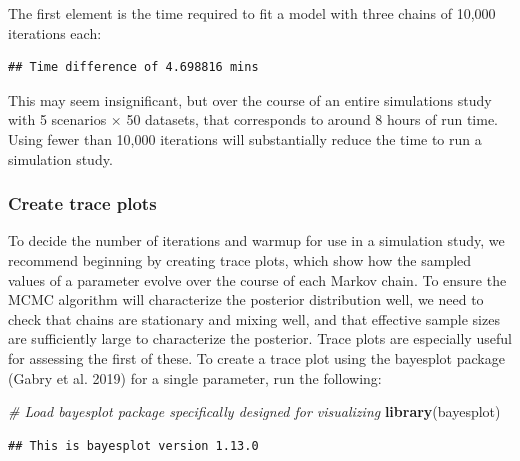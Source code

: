 \documentclass[
]{article}
\newenvironment{Shaded}{\begin{snugshade}}{\end{snugshade}}
\newcommand{\CommentTok}[1]{\textcolor[rgb]{0.56,0.35,0.01}{\textit{#1}}}
\newcommand{\FunctionTok}[1]{\textcolor[rgb]{0.13,0.29,0.53}{\textbf{#1}}}
\newcommand{\NormalTok}[1]{#1}
\newcommand{\SpecialCharTok}[1]{\textcolor[rgb]{0.81,0.36,0.00}{\textbf{#1}}}
\begin{document}
\linespread{1}

The first element is the time required to fit a model with three chains of 10,000 iterations each:

\linespread{1}

\begin{Shaded}
\end{Shaded}

\begin{verbatim}
## Time difference of 4.698816 mins
\end{verbatim}

\linespread{1}

This may seem insignificant, but over the course of an entire simulations study with 5 scenarios \(\times\) 50 datasets, that corresponds to around 8 hours of run time. Using fewer than 10,000 iterations will substantially reduce the time to run a simulation study.

\subsubsection{Create trace plots}\label{create-trace-plots}

To decide the number of iterations and warmup for use in a simulation study, we recommend beginning by creating trace plots, which show how the sampled values of a parameter evolve over the course of each Markov chain. To ensure the MCMC algorithm will characterize the posterior distribution well, we need to check that chains are stationary and mixing well, and that effective sample sizes are sufficiently large to characterize the posterior. Trace plots are especially useful for assessing the first of these. To create a trace plot using the bayesplot package (Gabry et al. 2019) for a single parameter, run the following:

\linespread{1}

\begin{Shaded}
\begin{Highlighting}[]
\CommentTok{\# Load bayesplot package specifically designed for visualizing }
\FunctionTok{library}\NormalTok{(bayesplot)}
\end{Highlighting}
\end{Shaded}

\begin{verbatim}
## This is bayesplot version 1.13.0
\end{verbatim}
\end{document}
